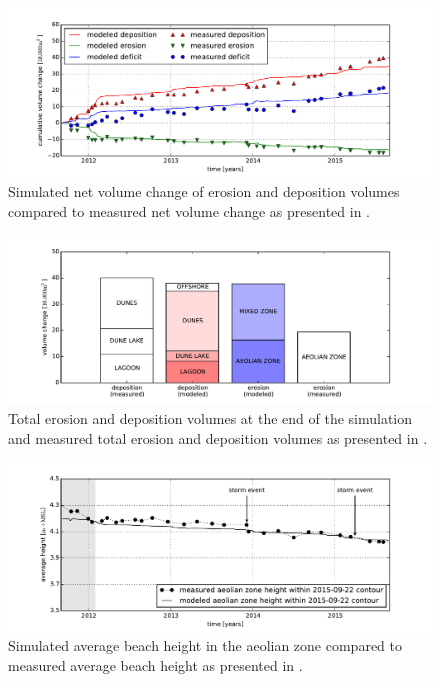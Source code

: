 \documentclass[preprint,12pt,authoryear]{elsarticle}
\begin{document}
\begin{figure}
  \centering
\includegraphics[width=\columnwidth]{../Figures/model_volumes_ts}
\caption{Simulated net volume change of erosion and deposition volumes
  compared to measured net volume change as presented in
  \citet{Hoonhout2017a}.}
  \label{fig:netvolumechange_model}
\end{figure}

\begin{figure}
  \centering
  \includegraphics[width=\columnwidth]{../Figures/model_volumes}
  \caption{Total erosion and deposition volumes at the end of the
    simulation and measured total erosion and deposition volumes as
    presented in \citet{Hoonhout2017a}.}
  \label{fig:volumes_bars_model}
\end{figure}

\begin{figure}
  \centering
  \includegraphics[width=\columnwidth]{../Figures/model_heights}
  \caption{Simulated average beach height in the aeolian zone compared
    to measured average beach height as presented in
    \citet{Hoonhout2017a}.}
  \label{fig:heights_model}
\end{figure}
\end{document}
